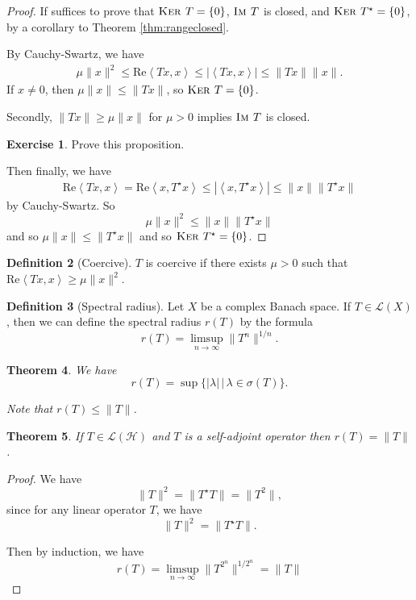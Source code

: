 \documentclass[10pt, oneside, reqno]{amsart}
\theoremstyle{plain}%
\newtheorem{thm}{Theorem}[section]
\numberwithin{equation}{section}
\theoremstyle{definition}
\newtheorem{defn}[thm]{Definition}
\newtheorem{exer}[thm]{Exercise}
\theoremstyle{remark}
\newcommand{\given}{ \, | \,}
\newcommand{\im}{\textsc{Im\ }}
\renewcommand{\ker}{\textsc{Ker\ }}
\newcommand{\iprod}[1]{\left\langle #1 \right\rangle}
\renewcommand{\Re}{\text{Re}}
\begin{document}
\begin{proof}
	If suffices to prove that $\ker T = \{ 0 \}$, $\im T$ is closed, and $\ker T^\star = \{ 0 \}$, by a corollary to Theorem \ref{thm:rangeclosed}. 
	
	By Cauchy-Swartz, we have \begin{align*}
		\mu \| x \|^2 \leq \Re\iprod{Tx, x} \leq |\iprod{Tx, x}| \leq \| Tx \| \| x \|.
	\end{align*}  If $x \neq 0$, then $\mu \| x \| \leq \| Tx \|$, so $\ker T = \{ 0 \}$.  
	
	Secondly, $\| Tx \| \geq \mu \| x \|$ for $\mu > 0$ implies $\im T$ is closed.
	
	\begin{exer}
		Prove this proposition.
	\end{exer}
	
	Then finally, we have \begin{align*}
		\Re \iprod{Tx, x} = \Re \iprod{x, T^\star x} \leq | \iprod{x, T^\star x} | \leq \| x \| \|T^\star x \|
	\end{align*} by Cauchy-Swartz.  So \[
		\mu \| x \|^2 \leq \| x \| \| T^\star x \|
	\] and so $\mu \| x \| \leq \| T^\star x \|$ and so $\ker T^\star = \{ 0 \}$.
\end{proof}


\begin{defn}[Coercive]
$T$ is coercive if there exists $\mu > 0$ such that $\Re \iprod{Tx, x} \geq \mu \| x \|^2$.  
\end{defn}


\begin{defn}[Spectral radius]
	Let $X$ be a complex Banach space.  If $T \in \mathcal L(X)$, then we can define the spectral radius $r(T)$ by the formula \[
		r(T) = \limsup_{n \rightarrow \infty} \| T^n \|^{1/n}.
	\]
\end{defn}

\begin{thm} 
	We have \[
		r(T) = \sup \{ |\lambda | \given \lambda \in \sigma(T) \}.
	\]  
	
	Note that $r(T) \leq \| T \|$.  
\end{thm}

\begin{thm} 
	If $T \in \mathcal L(\mathcal H)$ and $T$ is a self-adjoint operator then $r(T) = \| T \|$.   
\end{thm}

\begin{proof}
	We have \[
		\| T \|^2 = \| T^\star T \| = \| T^2 \|,
	\] since for any linear operator $T$, we have \[
		\| T \|^2 = \| T^\star T \|. 
	\]
	
	Then by induction, we have \[
		r(T) = \limsup_{n \rightarrow \infty} \| T^{2^n} \|^{1/2^n} = \| T \|
	\]
\end{proof}
\end{document}
